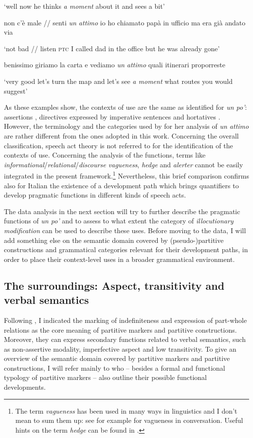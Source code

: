 \glt ‘well now he thinks \textit{a moment} about it and sees a bit’

\ex \label{ex:key:62b} non c’è male // senti \textit{un attimo} io ho chiamato papà in ufficio ma era già andato via

\glt ‘not bad // listen \textsc{ptc} I called dad in the office but he was already gone’

\ex \label{ex:key:62c} benissimo giriamo la carta e vediamo \textit{un attimo} quali itinerari proporreste

\glt ‘very good let’s turn the map and let’s see \textit{a moment} what routes you would suggest’
    \z
\z

As these examples show, the contexts of use are the same as identified for \textit{un po’}: assertions , directives expressed by imperative sentences  and hortatives . However, the terminology and the categories used by \citet{Voghera2017} for her analysis of \textit{un attimo} are rather different from the ones adopted in this work. Concerning the overall classification, speech act theory is not referred to for the identification of the contexts of use. Concerning the analysis of the functions, terms like \textit{informational}/\textit{relational}/\textit{discourse vagueness}, \textit{hedge} and \textit{alerter} cannot be easily integrated in the present framework.\footnote{The term \textit{vagueness} has been used in many ways in linguistics and I don’t mean to sum them up: see for example \citet{JuckerEtAl2003} for vagueness in conversation. Useful hints on the term \textit{hedge} can be found in \citet{KaltenböckEtAl2010}.} Nevertheless, this brief comparison confirms also for Italian the existence of a development path which brings quantifiers to develop pragmatic functions in different kinds of speech acts.

The data analysis in the next section will try to further describe the pragmatic functions of \textit{un po’} and to assess to what extent the category of \textit{illocutionary modification} can be used to describe these uses. Before moving to the data, I will add something else on the semantic domain covered by (pseudo-)partitive constructions and grammatical categories relevant for their development paths, in order to place their context-level uses in a broader grammatical environment.

\subsection{The surroundings: Aspect, transitivity and verbal semantics}
\hypertarget{Toc124860661}{}
Following \citet{LuraghiHuumo2014}, I indicated the marking of indefiniteness and expression of part-whole relations as the core meaning of partitive markers and partitive constructions. Moreover, they can express secondary functions related to verbal semantics, such as non-assertive modality, imperfective aspect and low transitivity. To give an overview of the semantic domain covered by partitive markers and partitive constructions, I will refer mainly to \citet{LuraghiKittilä2014} who – besides a formal and functional typology of partitive markers – also outline their possible functional developments.

